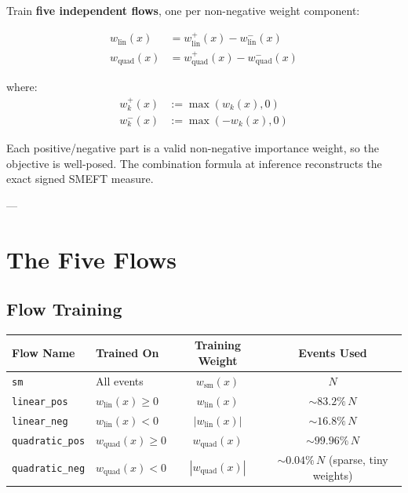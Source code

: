 \documentclass[11pt,a4paper]{article}
\begin{document}
Train \textbf{five independent flows}, one per non-negative weight component:

\begin{equation}
\begin{aligned}
w_{\text{lin}}(x) &= w_{\text{lin}}^+(x) - w_{\text{lin}}^-(x) \\
w_{\text{quad}}(x) &= w_{\text{quad}}^+(x) - w_{\text{quad}}^-(x)
\end{aligned}
\end{equation}

where:
\begin{equation}
\begin{aligned}
w_k^+(x) &:= \max(w_k(x), 0) \\
w_k^-(x) &:= \max(-w_k(x), 0)
\end{aligned}
\end{equation}

Each positive/negative part is a valid non-negative importance weight, so the objective is well-posed. 
The combination formula at inference reconstructs the exact signed SMEFT measure.

---

\section{The Five Flows}

\subsection{Flow Training}

\begin{table}[h!]
\centering
\begin{tabular}{llcc}
\toprule
Flow Name & Trained On & Training Weight & Events Used \\
\midrule
\texttt{sm} & All events & $w_{\text{sm}}(x)$ & $N$ \\
\texttt{linear\_pos} & $w_{\text{lin}}(x) \geq 0$ & $w_{\text{lin}}(x)$ & $\sim 83.2\% \, N$ \\
\texttt{linear\_neg} & $w_{\text{lin}}(x) < 0$ & $|w_{\text{lin}}(x)|$ & $\sim 16.8\% \, N$ \\
\texttt{quadratic\_pos} & $w_{\text{quad}}(x) \geq 0$ & $w_{\text{quad}}(x)$ & $\sim 99.96\% \, N$ \\
\texttt{quadratic\_neg} & $w_{\text{quad}}(x) < 0$ & $|w_{\text{quad}}(x)|$ & $\sim 0.04\% \, N$ (sparse, tiny weights) \\
\bottomrule
\end{tabular}
\end{table}
\end{document}
